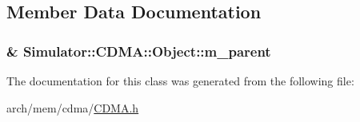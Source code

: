 \subsection{Member Data Documentation}
\hypertarget{class_simulator_1_1_c_d_m_a_1_1_object_aca8d30e62f66ebdebbe0291d60499368}{
\subsubsection[{m\+\_\+parent}]{\& Simulator\+::\+C\+D\+M\+A\+::\+Object\+::m\+\_\+parent\hspace{0.3cm}{\ttfamily [protected]}}}\label{class_simulator_1_1_c_d_m_a_1_1_object_aca8d30e62f66ebdebbe0291d60499368}


The documentation for this class was generated from the following file\+:\begin{DoxyCompactItemize}
\item 
arch/mem/cdma/\hyperlink{cdma_2_c_d_m_a_8h}{C\+D\+M\+A.\+h}\end{DoxyCompactItemize}
